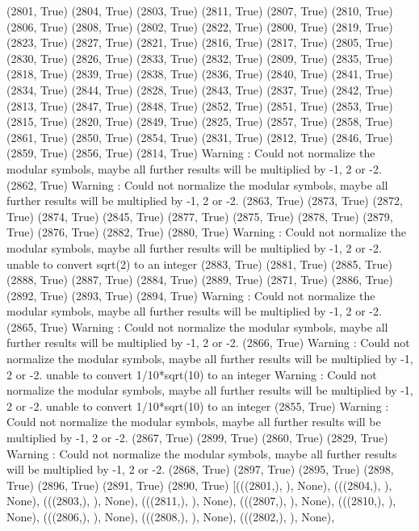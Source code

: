  (2801, True)
(2804, True)
(2803, True)
(2811, True)
(2807, True)
(2810, True)
(2806, True)
(2808, True)
(2802, True)
(2822, True)
(2800, True)
(2819, True)
(2823, True)
(2827, True)
(2821, True)
(2816, True)
(2817, True)
(2805, True)
(2830, True)
(2826, True)
(2833, True)
(2832, True)
(2809, True)
(2835, True)
(2818, True)
(2839, True)
(2838, True)
(2836, True)
(2840, True)
(2841, True)
(2834, True)
(2844, True)
(2828, True)
(2843, True)
(2837, True)
(2842, True)
(2813, True)
(2847, True)
(2848, True)
(2852, True)
(2851, True)
(2853, True)
(2815, True)
(2820, True)
(2849, True)
(2825, True)
(2857, True)
(2858, True)
(2861, True)
(2850, True)
(2854, True)
(2831, True)
(2812, True)
(2846, True)
(2859, True)
(2856, True)
(2814, True)
Warning : Could not normalize the modular symbols, maybe all further results will be multiplied by -1, 2 or -2.
(2862, True)
Warning : Could not normalize the modular symbols, maybe all further results will be multiplied by -1, 2 or -2.
(2863, True)
(2873, True)
(2872, True)
(2874, True)
(2845, True)
(2877, True)
(2875, True)
(2878, True)
(2879, True)
(2876, True)
(2882, True)
(2880, True)
Warning : Could not normalize the modular symbols, maybe all further results will be multiplied by -1, 2 or -2.
unable to convert sqrt(2) to an integer
(2883, True)
(2881, True)
(2885, True)
(2888, True)
(2887, True)
(2884, True)
(2889, True)
(2871, True)
(2886, True)
(2892, True)
(2893, True)
(2894, True)
Warning : Could not normalize the modular symbols, maybe all further results will be multiplied by -1, 2 or -2.
(2865, True)
Warning : Could not normalize the modular symbols, maybe all further results will be multiplied by -1, 2 or -2.
(2866, True)
Warning : Could not normalize the modular symbols, maybe all further results will be multiplied by -1, 2 or -2.
unable to convert 1/10*sqrt(10) to an integer
Warning : Could not normalize the modular symbols, maybe all further results will be multiplied by -1, 2 or -2.
unable to convert 1/10*sqrt(10) to an integer
(2855, True)
Warning : Could not normalize the modular symbols, maybe all further results will be multiplied by -1, 2 or -2.
(2867, True)
(2899, True)
(2860, True)
(2829, True)
Warning : Could not normalize the modular symbols, maybe all further results will be multiplied by -1, 2 or -2.
(2868, True)
(2897, True)
(2895, True)
(2898, True)
(2896, True)
(2891, True)
(2890, True)
[(((2801,), {}), None),
 (((2804,), {}), None),
 (((2803,), {}), None),
 (((2811,), {}), None),
 (((2807,), {}), None),
 (((2810,), {}), None),
 (((2806,), {}), None),
 (((2808,), {}), None),
 (((2802,), {}), None),
